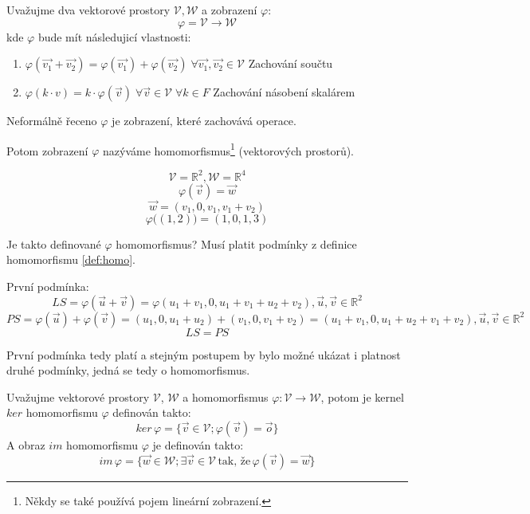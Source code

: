 \begin{definition}
    Uvažujme dva vektorové prostory $\mathcal{V}, \mathcal{W}$ a zobrazení $\varphi$:
    $$\varphi = \mathcal{V} \rightarrow \mathcal{W}$$
    kde $\varphi$ bude mít následujicí vlastnosti:
    \begin{enumerate}
        \item $\varphi(\vec{v_1} + \vec{v_2}) = \varphi(\vec{v_1}) + \varphi(\vec{v_2})\;
            \forall \vec{v_1}, \vec{v_2} \in \mathcal{V}$ \hfill Zachování součtu
        \item $\varphi(k\cdot v) = k \cdot \varphi (\vec{v}) \;
            \forall \vec{v} \in \mathcal{V} \; \forall k \in F$ \hfill Zachování násobení skalárem
    \end{enumerate}
    Neformálně řeceno $\varphi$ je zobrazení, které zachovává operace.

    Potom zobrazení $\varphi$ nazýváme homomorfismus\footnote{Někdy se také používá pojem
    lineární zobrazení.} (vektorových prostorů).
    \label{def:homo}
\end{definition}

\begin{example}
    $$\mathcal{V} = \mathbb{R}^2, \mathcal{W} = \mathbb{R}^4$$
    $$\varphi(\vec{v}) = \vec{w}$$
    $$\vec{w} = (v_1, 0, v_1, v_1 + v_2)$$
    $$\varphi\big((1,2)\big) = (1, 0, 1, 3)$$

    Je takto definované $\varphi$ homomorfismus? Musí platit podmínky z definice
    homomorfismu \ref{def:homo}.

    První podmínka:
    $$LS = \varphi(\vec{u} + \vec{v}) = \varphi(u_1 + v_1, 0, u_1 + v_1 + u_2 + v_2),
    \vec{u}, \vec{v} \in \mathbb{R}^2$$
    $$PS = \varphi(\vec{u}) + \varphi(\vec{v}) = (u_1, 0, u_1 + u_2) + (v_1, 0, v_1 + v_2) =
    (u_1 + v_1, 0, u_1 + u_2 + v_1 + v_2), \vec{u}, \vec{v} \in \mathbb{R}^2$$
    $$LS = PS$$

    První podmínka tedy platí a stejným postupem by bylo možné ukázat i platnost
    druhé podmínky, jedná se tedy o homomorfismus.
\end{example}

\begin{definition} Uvažujme vektorové prostory $\mathcal{V}$, $\mathcal{W}$
    a homomorfismus $\varphi : \mathcal{V} \rightarrow \mathcal{W}$, potom je kernel $ker$ homomorfismu $\varphi$ definován takto:
    $$ker\,\varphi = \{\vec{v} \in \mathcal{V}; \varphi(\vec{v}) = \vec{o}\}$$
    A obraz $im$ homomorfismu $\varphi$ je definován takto:
    $$im\,\varphi = \{\vec{w} \in \mathcal{W}; \exists \vec{v} \in \mathcal{V}\,
        \text{tak, že}\, \varphi(\vec{v}) = \vec{w}\}$$
\end{definition}

